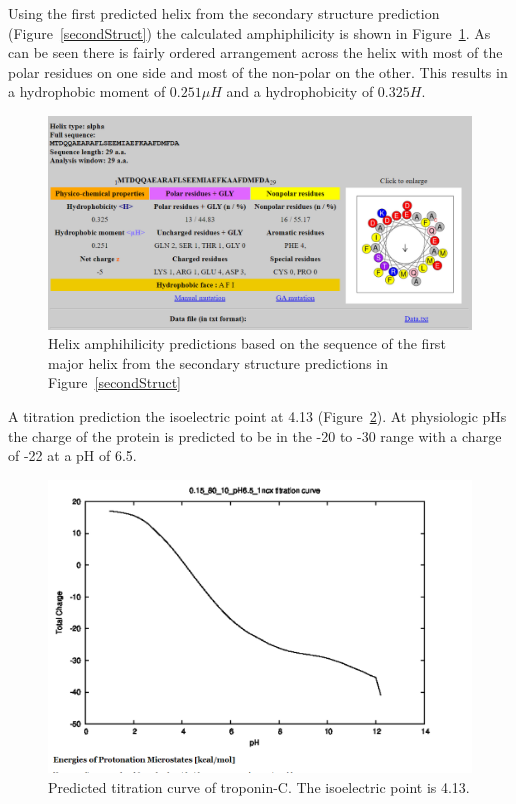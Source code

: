 \documentclass[12pt]{article}
\begin{document}
Using the first predicted helix from the secondary structure prediction (Figure~\ref{secondStruct}) the calculated amphiphilicity is shown in Figure~\ref{helix1}. As can be seen there is fairly ordered arrangement across the helix with most of the polar residues on one side and most of the non-polar on the other. This results in a hydrophobic moment of $0.251 \mu H$ and a hydrophobicity of $0.325 H$.

\begin{figure}[H]
	\centering
	\includegraphics[width=.95\linewidth]{Helix1_plot.png}
	
	\caption{Helix amphihilicity predictions based on the sequence of the first major helix from the secondary structure predictions in Figure~\ref{secondStruct}}
	\label{helix1}
\end{figure}

A titration prediction the isoelectric point at 4.13 (Figure~\ref{titration}). At physiologic pHs the charge of the protein is predicted to be in the -20 to -30 range with a charge of -22 at a pH of 6.5.

\begin{figure}[H]
	\centering
	\includegraphics[width=.95\linewidth]{ComputedTitration.png}
	
	\caption{Predicted titration curve of troponin-C. The isoelectric point is 4.13.}
	\label{titration}
\end{figure}
\end{document}

